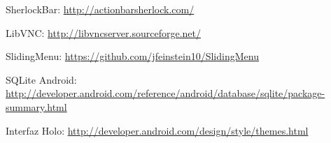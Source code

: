 \begin{thebibliography}{11}
SherlockBar: \url{http://actionbarsherlock.com/}

LibVNC: \url{http://libvncserver.sourceforge.net/}

SlidingMenu: \url{https://github.com/jfeinstein10/SlidingMenu}

SQLite Android: \url{http://developer.android.com/reference/android/database/sqlite/package-summary.html}

Interfaz Holo: \url{http://developer.android.com/design/style/themes.html}

\end{thebibliography} 
